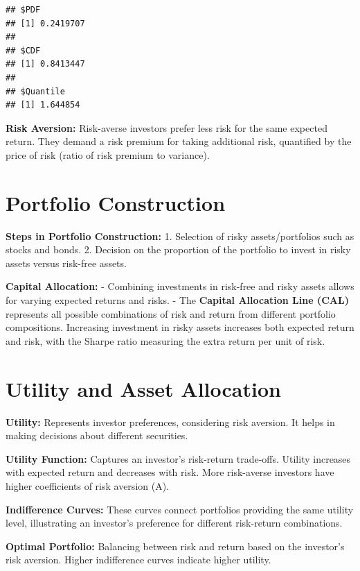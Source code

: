 \documentclass[
]{book}
\begin{document}
\begin{verbatim}
## $PDF
## [1] 0.2419707
## 
## $CDF
## [1] 0.8413447
## 
## $Quantile
## [1] 1.644854
\end{verbatim}

\textbf{Risk Aversion:} Risk-averse investors prefer less risk for the same expected return. They demand a risk premium for taking additional risk, quantified by the price of risk (ratio of risk premium to variance).

\hypertarget{portfolio-construction}{%
\section{Portfolio Construction}\label{portfolio-construction}}

\textbf{Steps in Portfolio Construction:}
1. Selection of risky assets/portfolios such as stocks and bonds.
2. Decision on the proportion of the portfolio to invest in risky assets versus risk-free assets.

\textbf{Capital Allocation:}
- Combining investments in risk-free and risky assets allows for varying expected returns and risks.
- The \textbf{Capital Allocation Line (CAL)} represents all possible combinations of risk and return from different portfolio compositions. Increasing investment in risky assets increases both expected return and risk, with the Sharpe ratio measuring the extra return per unit of risk.

\hypertarget{utility-and-asset-allocation}{%
\section{Utility and Asset Allocation}\label{utility-and-asset-allocation}}

\textbf{Utility:} Represents investor preferences, considering risk aversion. It helps in making decisions about different securities.

\textbf{Utility Function:} Captures an investor's risk-return trade-offs. Utility increases with expected return and decreases with risk. More risk-averse investors have higher coefficients of risk aversion (A).

\textbf{Indifference Curves:} These curves connect portfolios providing the same utility level, illustrating an investor's preference for different risk-return combinations.

\textbf{Optimal Portfolio:} Balancing between risk and return based on the investor's risk aversion. Higher indifference curves indicate higher utility.
\end{document}
